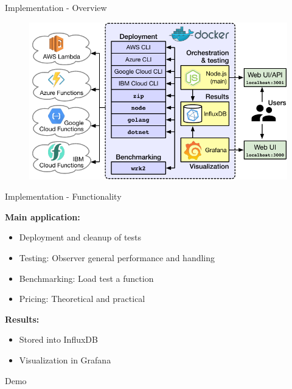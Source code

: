 \documentclass[10pt]{beamer}
\begin{document}
{
\begin{frame}{Implementation - Overview}

	\begin{figure}
	\centering
	\includegraphics[scale=0.7]{bilder/archi}
	\end{figure}
	
\end{frame}
}

\begin{frame}{Implementation - Functionality}

\textbf{Main application:}
	\begin{itemize}
		\item Deployment and cleanup of tests
		\item Testing: Observer general performance and handling
		\item Benchmarking: Load test a function
		\item Pricing: Theoretical and practical
	\end{itemize}
\textbf{Results:}
\begin{itemize}
	\item Stored into InfluxDB
	\item Visualization in Grafana
\end{itemize}
\end{frame}

\begin{frame}[standout]

	Demo

\end{frame}
\end{document}

